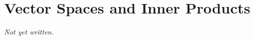 \chapter{Vector Spaces and Inner Products}\label{ch:vector-spaces-inner-products}


\textit{Not yet written.}
